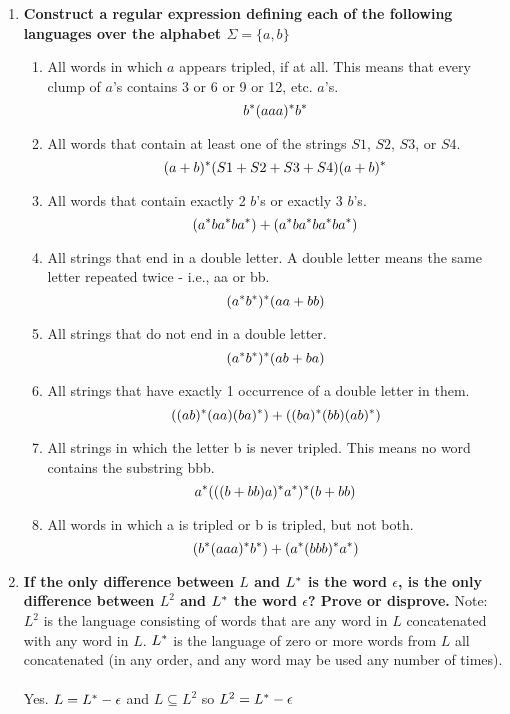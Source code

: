 

\begin{enumerate}
	
\item \textbf{Construct a regular expression defining each of the following languages over the alphabet $\Sigma = \{a, b\}$}

\begin{enumerate}
	\item All words in which $a$ appears tripled, if at all. This means that every clump of $a$'s contains 3 or 6 or 9 or 12, etc. $a$'s.
	$$b{}^\ast(aaa){}^\ast b{}^\ast$$
    \item All words that contain at least one of the strings $S1$, $S2$, $S3$, or $S4$.
    $$(a+b){}^\ast(S1 + S2 + S3 + S4)(a + b){}^\ast$$
    
    \item All words that contain exactly 2 $b$'s or exactly 3 $b$'s.
    $$(a{}^\ast ba{}^\ast ba{}^\ast) + (a{}^\ast ba{}^\ast ba{}^\ast ba{}^\ast)$$
    \item All strings that end in a double letter. A double letter means the same letter repeated twice - i.e., aa or bb.
    $$(a{}^\ast b{}^\ast){}^\ast(aa + bb)$$
    \item All strings that do not end in a double letter.
    $$(a{}^\ast b{}^\ast){}^\ast(ab + ba)$$
    \item All strings that have exactly 1 occurrence of a double letter in them.
    $$((ab){}^\ast(aa)(ba){}^\ast) + ((ba){}^\ast(bb)(ab){}^\ast)$$
    \item All strings in which  the letter b is never tripled. This means no word contains the substring bbb.
    $$ a{}^\ast(((b + bb)a){}^\ast a{}^\ast) {}^\ast(b + bb) $$
    \item All words in which a is tripled or b is tripled, but not both.
    $$ (b{}^\ast(aaa){}^\ast b{}^\ast) + (a{}^\ast(bbb){}^\ast a{}^\ast)  $$
\end{enumerate}
		

\newpage
\item \textbf{If the only difference between $L$ and $L{}^\ast$ is the word $\epsilon$, is the only difference between $L^2$ and $L{}^\ast$ the word $\epsilon$? Prove or disprove.}
Note: $ L^2$ is the language consisting of words that are any word in $L$ concatenated with any word in $L$. $L{}^\ast$ is the language of zero or more words from $L$ all concatenated (in any order, and any word may be used any number of times).
\\\\
Yes.  $L = L{}^\ast - \epsilon$ and $L \subseteq L^2$  so $L^2 = L{}^\ast  - \epsilon$ 


\end{enumerate}
